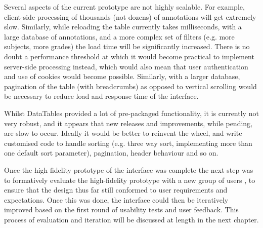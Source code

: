 Several aspects of the current prototype are not highly scalable. For example, client-side processing of thousands (not dozens) of annotations will get extremely slow. Similarly, while reloading the table currently takes milliseconds, with a large database of annotations, and a more complex set of filters (e.g. more subjects, more grades) the load time will be significantly increased. There is no doubt a performance threshold at which it would become practical to implement server-side processing instead, which would also mean that user authentication and use of cookies would become possible. Similarly, with a larger database, pagination of the table (with breadcrumbs) as opposed to vertical scrolling would be necessary to reduce load and response time of the interface. 

Whilst DataTables provided a lot of pre-packaged functionality, it is currently not very robust, and it appears that new releases and improvements, while pending, are slow to occur. Ideally it would be better to reinvent the wheel, and write customised code to handle sorting (e.g. three way sort, implementing more than one default sort parameter), pagination, header behaviour and so on. 

Once the high fidelity prototype of the interface was complete the next step was to formatively evaluate the high-fidelity prototype with a new group of users \citep[p. 329]{RogersPreece}, to ensure that the design thus far still conformed to user requirements and expectations. Once this was done, the interface could then be iteratively improved based on the first round of usability tests and user feedback. This process of evaluation and iteration will be discussed at length in the next chapter. 
